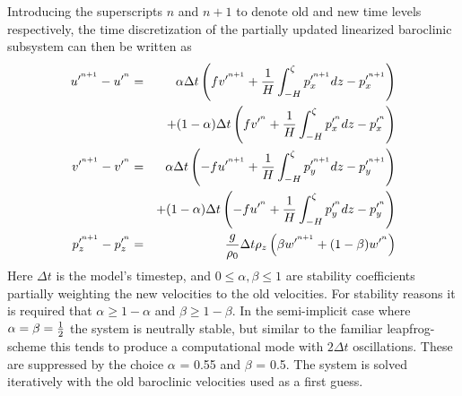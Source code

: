 Introducing the superscripts $n$ and $n+1$ to denote 
old and new time levels respectively,
the time discretization of the partially updated 
linearized baroclinic subsystem can then be written as
\begin{eqnarray}
\label{eqn:baroclinic_mom_u_discr}
u^{\prime^{n+1}} - u^{\prime^{n}}
&=&
\alpha \Delta{t}
\left(
f v^{\prime^{n+1}}
+ {1 \over{H}} \int_{-H}^{\zeta}p_{x}^{\prime^{n+1}} dz
- p_{x}^{\prime^{n+1}}
\right)
\nonumber \\
&&
+ (1-\alpha) \Delta{t}
\left(
f v^{\prime^{n}}
+ {1 \over{H}} \int_{-H}^{\zeta}p_{x}^{\prime^{n}} dz
-p_{x}^{\prime^{n}}
\right)
\\
\label{eqn:baroclinic_mom_v_discr}
v^{\prime^{n+1}} - v^{\prime^{n}}
&=&
\alpha \Delta{t}
\left(
- f u^{\prime^{n+1}}
+ {1 \over{H}} \int_{-H}^{\zeta}p_{y}^{\prime^{n+1}} dz
- p_{y}^{\prime^{n+1}}
\right)
\nonumber \\
&&
+ (1-\alpha) \Delta{t}
\left(
- f u^{\prime^{n}}
+ {1 \over{H}} \int_{-H}^{\zeta}p_{y}^{\prime^{n}} dz
-p_{y}^{\prime^{n}}
\right)
\\
\label{eqn:baroclinic_press_discr}
p_{z}^{\prime^{n+1}} - p_{z}^{\prime^{n}}
&=&
{g \over \rho_0} \Delta{t} \rho_z
\left(
\beta w^{\prime^{n+1}} + (1-\beta)w^{\prime^{n}}
\right)
\end{eqnarray}
Here $\Delta t$ is the model's timestep,
and $0 \le \alpha, \beta \le 1$ 
are stability coefficients partially weighting 
the new velocities to the old velocities.
For stability reasons it is required that $\alpha \ge 1-\alpha$ and $\beta\ge 1-\beta$.
In the semi-implicit case where $\alpha = \beta = {1 \over 2}$ the system is neutrally
stable, but similar to the familiar leapfrog-scheme this tends to produce
a computational mode with \mbox{$2\Delta t$} oscillations. 
These are suppressed
by the choice $\alpha$ = 0.55 and $\beta$ = 0.5.
The system is solved iteratively with the old baroclinic velocities used as a first guess.

